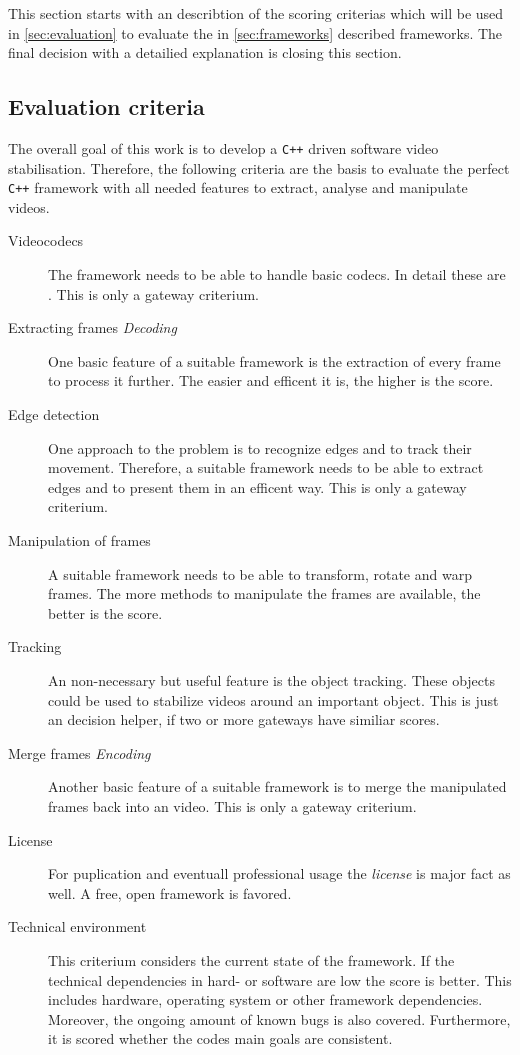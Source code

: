 This section starts with an describtion of the scoring criterias which will be used in \cref{sec:evaluation} to evaluate the in \cref{sec:frameworks} described frameworks. The final decision with a detailied explanation is closing this section.

\subsection{Evaluation criteria}\label{sec:requirementanal}
The overall goal of this work is to develop a \texttt{C++} driven software video stabilisation. Therefore, the following criteria are the basis to evaluate the perfect \texttt{C++} framework with all needed features to extract, analyse and manipulate videos.

\begin{description}
    \item[Videocodecs] The framework needs to be able to handle basic codecs. In detail these are \tbd. This is only a gateway criterium.
    \item[Extracting frames \textit{Decoding}] One basic feature of a suitable framework is the extraction of every frame to process it further. The easier and efficent it is, the higher is the score.
    \item[Edge detection] One approach to the problem is to recognize edges and to track their movement. Therefore, a suitable framework needs to be able to extract edges and to present them in an efficent way. This is only a gateway criterium. \tbd[Score]
    \item[Manipulation of frames] A suitable framework needs to be able to transform, rotate and warp frames. The more methods to manipulate the frames are available, the better is the score.
    \item[Tracking] An non-necessary but useful feature is the object tracking. These objects could be used to stabilize videos around an important object. This is just an decision helper, if two or more gateways have similiar scores.
    \item[Merge frames \textit{Encoding}] Another basic feature of a suitable framework is to merge the manipulated frames back into an video. This is only a gateway criterium.
    \item[License] For puplication and eventuall professional usage the \textit{license} is major fact as well. A free, open framework is favored.
    \item[Technical environment] This criterium considers the current state of the framework. If the technical dependencies in hard- or software are low the score is better. This includes hardware, operating system or other framework dependencies. Moreover, the ongoing amount of known bugs is also covered. Furthermore, it is scored whether the codes main goals are consistent.

\end{description}
